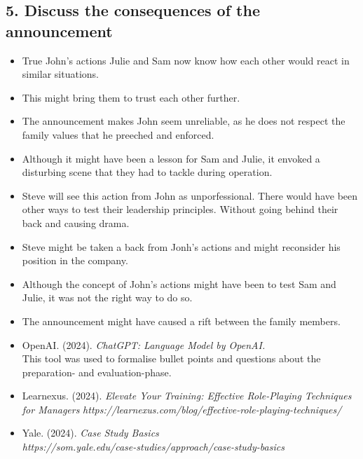 \documentclass[a4paper,10pt]{article}
\begin{document}
\subsection{5. Discuss the consequences of the announcement}
\begin{itemize}
    \item True John's actions Julie and Sam now know how each other would react in similar situations.
    \item This might bring them to trust each other further.
    \item The announcement makes John seem unreliable, as he does not respect the family values that he preeched and enforced.
    \item Although it might have been a lesson for Sam and Julie, it envoked a disturbing scene that they had to tackle during operation.
    \item Steve will see this action from John as unporfessional. There would have been other ways to test their leadership principles. Without going behind their back and causing drama.
    \item Steve might be taken a back from Jonh's actions and might reconsider his position in the company.
    \item Although the concept of John's actions might have been to test Sam and Julie, it was not the right way to do so.
    \item The announcement might have caused a rift between the family members.
\end{itemize}

\begin{itemize}
    \item OpenAI. (2024). \textit{ChatGPT: Language Model by OpenAI.} \\ 
    This tool was used to formalise bullet points and questions about the preparation- and evaluation-phase.
    \item Learnexus. (2024). \textit{Elevate Your Training: Effective Role-Playing Techniques for Managers} \textit{https://learnexus.com/blog/effective-role-playing-techniques/}
    \item Yale. (2024). \textit{Case Study Basics} \\ \textit{https://som.yale.edu/case-studies/approach/case-study-basics}
\end{itemize}
\end{document}

